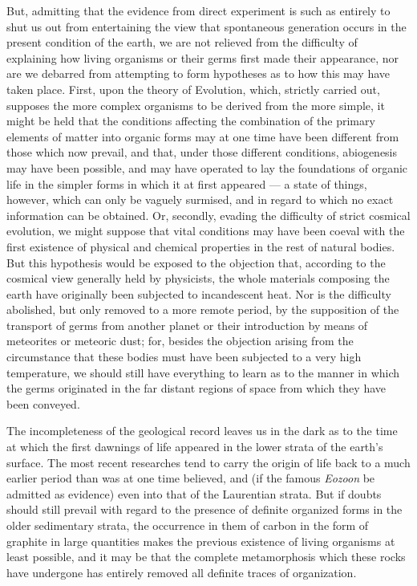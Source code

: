 \documentclass[a4paper, 11pt, oneside, english]{article}
\begin{document}
But, admitting that the evidence from direct experiment is such as entirely to shut us out from entertaining the view that spontaneous generation occurs in the present condition of the earth, we are not relieved from the difficulty of explaining how living organisms or their germs first made their appearance, nor are we debarred from attempting to form hypotheses as to how this may have taken place. First, upon the theory of Evolution, which, strictly carried out, supposes the more complex organisms to be derived from the more simple, it might be held that the conditions affecting the combination of the primary elements of matter into organic forms may at one time have been different from those which now prevail, and that, under those different conditions, abiogenesis may have been possible, and may have operated to lay the foundations of organic life in the simpler forms in which it at first appeared --- a state of things, however, which can only be vaguely surmised, and in regard to which no exact information can be obtained. Or, secondly, evading the difficulty of strict cosmical evolution, we might suppose that vital conditions may have been coeval with the first existence of physical and chemical properties in the rest of natural bodies. But this hypothesis would be exposed to the objection that, according to the cosmical view generally held by physicists, the whole materials composing the earth have originally been subjected to incandescent heat. Nor is the difficulty abolished, but only removed to a more remote period, by the supposition of the transport of germs from another planet or their introduction by means of meteorites or meteoric dust; for, besides the objection arising from the circumstance that these bodies must have been subjected to a very high temperature, we should still have everything to learn as to the manner in which the germs originated in the far distant regions of space from which they have been conveyed.

The incompleteness of the geological record leaves us in the dark as to the time at which the first dawnings of life appeared in the lower strata of the earth's surface. The most recent researches tend to carry the origin of life back to a much earlier period than was at one time believed, and (if the famous \emph{Eozoon} be admitted as evidence) even into that of the Laurentian strata. But if doubts should still prevail with regard to the presence of definite organized forms in the older sedimentary strata, the occurrence in them of carbon in the form of graphite in large quantities makes the previous existence of living organisms at least possible, and it may be that the complete metamorphosis which these rocks have undergone has entirely removed all definite traces of organization.
\end{document}
